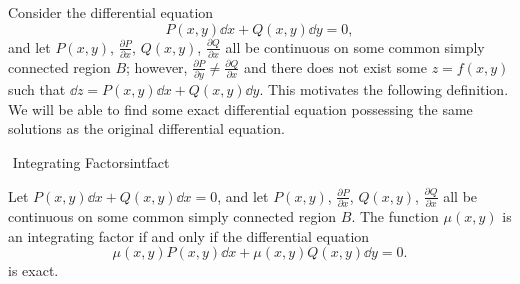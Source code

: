         Consider the differential equation
        \begin{equation*}
            P(x,y)\dd x+Q(x,y)\dd y=0,
        \end{equation*}
        and let \(P(x,y)\), \(\frac{\partial P}{\partial x}\), \(Q(x,y)\), \(\frac{\partial Q}{\partial x}\) all be continuous on some common simply connected region \(B\); however, \(\frac{\partial P}{\partial y}\neq\frac{\partial Q}{\partial x}\) and there does not exist some \(z=f(x,y)\) such that \(\dd z=P(x,y)\dd x+Q(x,y)\dd y\). This motivates the following definition. We will be able to find some exact differential equation possessing the same solutions as the original differential equation.
        \begin{definition}{\Stop\,\,Integrating Factors}{intfact}

            Let \(P(x,y)\dd x+Q(x,y)\dd x=0\), and let \(P(x,y)\), \(\frac{\partial P}{\partial x}\), \(Q(x,y)\), \(\frac{\partial Q}{\partial x}\) all be continuous on some common simply connected region \(B\). The function \(\mu(x,y)\) is an integrating factor if and only if the differential equation
            \begin{equation*}
                \mu(x,y)P(x,y)\dd x+\mu(x,y)Q(x,y)\dd y=0.
            \end{equation*}
            is exact. 
        \end{definition}
